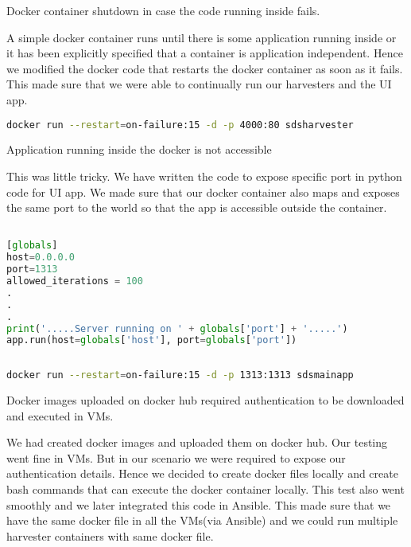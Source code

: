 \begin{flattened}
\Challenge Docker container shutdown in case the code running inside fails.

\TheSolution A simple docker container runs until there is some  application running inside or it has been explicitly specified that a container is application independent. 
Hence we modified the docker code that restarts the docker container as soon as it fails. This made sure that we were able to continually run our harvesters and the UI app. 
\begin{tcolorbox}
\begin{lstlisting}[language=bash, caption=Restart the docker container on failure]
docker run --restart=on-failure:15 -d -p 4000:80 sdsharvester
\end{lstlisting}
\end{tcolorbox}

\Challenge Application running inside the docker is not accessible

\TheSolution This was little tricky. We have written the code to expose specific port in python code for UI app. We made sure that our docker container also maps and exposes the same port to the world so that the app is accessible outside the container.
\begin{tcolorbox}
\begin{lstlisting}[language=python, caption=Expose Port in Application]

[globals]
host=0.0.0.0
port=1313
allowed_iterations = 100 
.
.
.
print('.....Server running on ' + globals['port'] + '.....')
app.run(host=globals['host'], port=globals['port'])
   
\end{lstlisting}
\end{tcolorbox}

\begin{tcolorbox}
\begin{lstlisting}[language=bash, caption=Expose Port in Docker Container]
docker run --restart=on-failure:15 -d -p 1313:1313 sdsmainapp
\end{lstlisting}
\end{tcolorbox}

\Challenge Docker images uploaded on docker hub required authentication to be downloaded and executed in VMs.

\TheSolution We had created docker images and uploaded them on docker hub. Our testing went fine in VMs. But in our scenario we were required to expose our authentication details. Hence we decided to create docker files locally and create bash commands that can execute the docker container locally. This test also went smoothly and we later integrated this code in Ansible. This made sure that we have the same docker file in all the VMs(via Ansible) and we could run multiple harvester containers with same docker file.  

\end{flattened}
